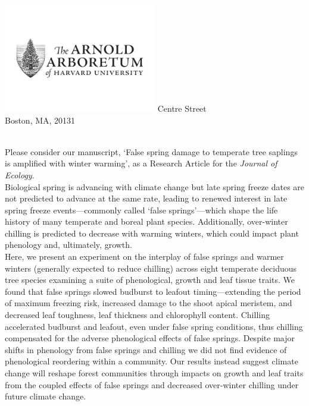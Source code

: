\documentclass[11pt,a4paper]{article}\usepackage[]{graphicx}\usepackage[]{color}
\begin{document}
\includegraphics[width=0.5\textwidth, right]{AA_logo.jpg}
 Centre Street\\
\noindent Boston, MA, 20131\\

\vspace{1.5ex}


\vspace{3ex}\\
\noindent Please consider our manuscript, `False spring damage to temperate tree saplings is amplified with winter warming', as a Research Article for the \textit{Journal of Ecology}. \\

\noindent Biological spring is advancing with climate change but late spring freeze dates are not predicted to advance at the same rate, leading to renewed interest in late spring freeze events---commonly called `false springs'---which shape the life history of many temperate and boreal plant species. Additionally, over-winter chilling is predicted to decrease with warming winters, which could impact plant phenology and, ultimately, growth. \\

\noindent Here, we present an experiment on the interplay of false springs and warmer winters (generally expected to reduce chilling) across eight temperate deciduous tree species examining a suite of phenological, growth and leaf tissue traits. We found that false springs slowed budburst to leafout timing---extending the period of maximum freezing risk, increased damage to the shoot apical meristem, and decreased leaf toughness, leaf thickness and chlorophyll content. Chilling accelerated budburst and leafout, even under false spring conditions, thus chilling compensated for the adverse phenological effects of false springs. Despite major shifts in phenology from false springs and chilling we did not find evidence of phenological reordering within a community. Our results instead suggest climate change will reshape forest communities through impacts on growth and leaf traits from the coupled effects of false springs and decreased over-winter chilling under future climate change.\\
\end{document}
